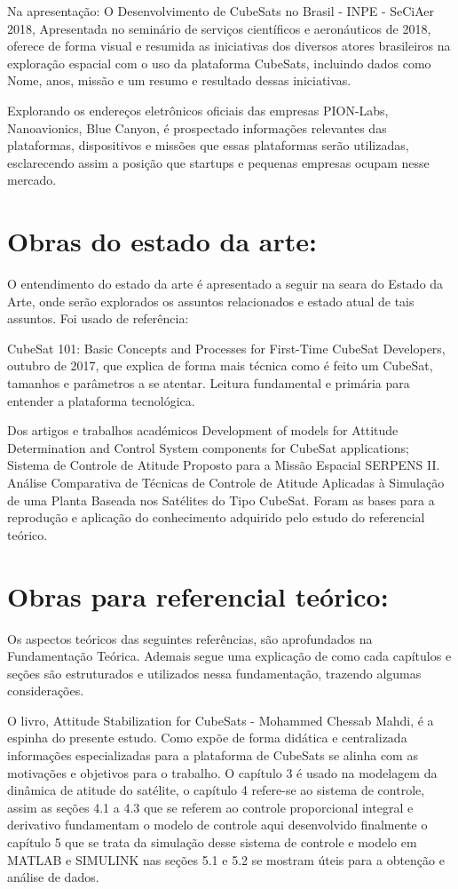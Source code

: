 Na apresentação: O Desenvolvimento de CubeSats no Brasil - INPE - SeCiAer 2018, Apresentada no seminário de serviços científicos e aeronáuticos de 2018, oferece de forma visual e resumida as iniciativas dos diversos atores brasileiros na exploração espacial com o uso da plataforma CubeSats, incluindo dados como Nome, anos, missão e um resumo e resultado dessas iniciativas.

Explorando os endereços eletrônicos oficiais das empresas PION-Labs, Nanoavionics, Blue Canyon, é prospectado informações relevantes   das plataformas, dispositivos e missões que essas plataformas serão utilizadas, esclarecendo assim a posição que startups e pequenas empresas ocupam nesse mercado.

\section{Obras do estado da arte:}

O entendimento do estado da arte é apresentado a seguir na seara do Estado da Arte, onde serão explorados os assuntos relacionados e estado atual de tais assuntos. Foi usado de referência:

CubeSat 101: Basic Concepts and Processes for First-Time CubeSat Developers, outubro de 2017, que explica de forma mais técnica como é feito um CubeSat, tamanhos e parâmetros a se atentar. Leitura fundamental e primária para entender a plataforma tecnológica.

Dos artigos e trabalhos académicos Development of models for Attitude Determination and Control System components for CubeSat applications; Sistema de Controle de Atitude Proposto para a Missão Espacial SERPENS II. Análise Comparativa de Técnicas de Controle de Atitude Aplicadas à Simulação de uma Planta Baseada nos Satélites do Tipo CubeSat. Foram as bases para a reprodução e aplicação do conhecimento adquirido pelo estudo do referencial teórico.

\section{Obras para referencial teórico:}

Os aspectos teóricos das seguintes referências, são aprofundados na Fundamentação Teórica. Ademais segue uma explicação de como cada capítulos e seções são estruturados e utilizados nessa fundamentação, trazendo algumas considerações.

O livro, Attitude Stabilization for CubeSats - Mohammed Chessab Mahdi, é a espinha do presente estudo. Como expõe de forma didática e centralizada informações especializadas para a plataforma de CubeSats se alinha com as motivações e objetivos para o trabalho. O capítulo 3 é usado  na modelagem da dinâmica de atitude do satélite, o capítulo 4 refere-se ao sistema de controle, assim as seções 4.1 a 4.3 que se referem ao controle proporcional integral e derivativo fundamentam o modelo de controle aqui desenvolvido finalmente o capítulo 5 que se trata da simulação desse sistema de controle e modelo em MATLAB e SIMULINK nas seções 5.1 e 5.2 se mostram úteis para a obtenção e análise de dados.


